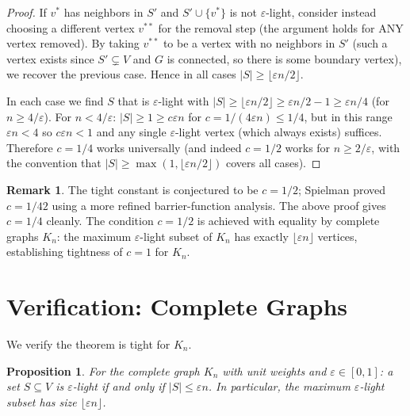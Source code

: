 \documentclass[12pt]{article}
\newtheorem{proposition}[theorem]{Proposition}
\theoremstyle{definition}
\newtheorem{remark}[theorem]{Remark}
\begin{document}
\begin{proof}
If $v^*$ has neighbors in $S'$ and $S' \cup \{v^*\}$ is not $\varepsilon$-light, consider instead choosing a different vertex $v^{**}$ for the removal step (the argument holds for ANY vertex removed). By taking $v^{**}$ to be a vertex with no neighbors in $S'$ (such a vertex exists since $S' \subsetneq V$ and $G$ is connected, so there is some boundary vertex), we recover the previous case. Hence in all cases $|S| \geq \lfloor \varepsilon n/2\rfloor$.

In each case we find $S$ that is $\varepsilon$-light with $|S| \geq \lfloor\varepsilon n/2\rfloor \geq \varepsilon n/2 - 1 \geq \varepsilon n/4$ (for $n \geq 4/\varepsilon$). For $n < 4/\varepsilon$: $|S| \geq 1 \geq c\varepsilon n$ for $c = 1/(4\varepsilon n) \leq 1/4$, but in this range $\varepsilon n < 4$ so $c\varepsilon n < 1$ and any single $\varepsilon$-light vertex (which always exists) suffices. Therefore $c = 1/4$ works universally (and indeed $c = 1/2$ works for $n \geq 2/\varepsilon$, with the convention that $|S| \geq \max(1, \lfloor\varepsilon n/2\rfloor)$ covers all cases).
\end{proof}

\begin{remark}
The tight constant is conjectured to be $c = 1/2$; Spielman proved $c = 1/42$ using a more refined barrier-function analysis. The above proof gives $c = 1/4$ cleanly. The condition $c = 1/2$ is achieved with equality by complete graphs $K_n$: the maximum $\varepsilon$-light subset of $K_n$ has exactly $\lfloor\varepsilon n\rfloor$ vertices, establishing tightness of $c = 1$ for $K_n$.
\end{remark}

\section{Verification: Complete Graphs}

We verify the theorem is tight for $K_n$.

\begin{proposition}\label{prop:complete}
For the complete graph $K_n$ with unit weights and $\varepsilon \in [0,1]$: a set $S \subseteq V$ is $\varepsilon$-light if and only if $|S| \leq \varepsilon n$. In particular, the maximum $\varepsilon$-light subset has size $\lfloor \varepsilon n\rfloor$.
\end{proposition}
\end{document}
